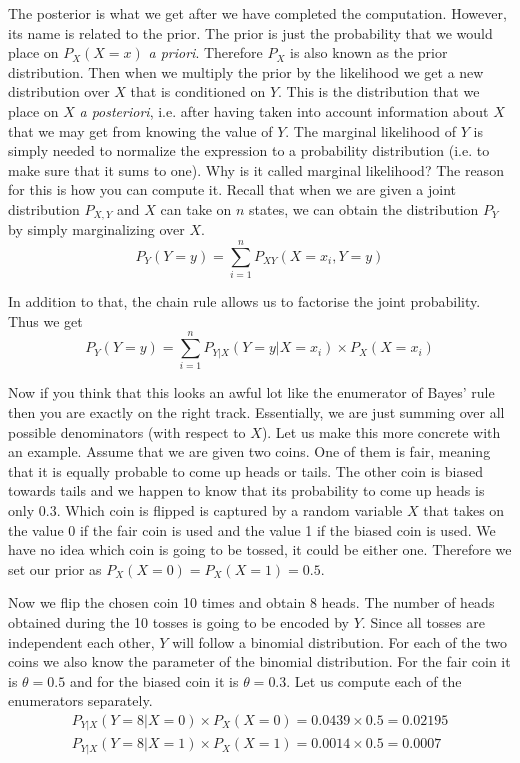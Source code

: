 \documentclass[a4paper,11pt,leqno]{report}
\begin{document}
The posterior is what we get after we have completed the computation. However, its name is related to the prior.
The prior is just the probability that we would place on $ P_{X}(X=x) $ \textit{a priori}. Therefore $ P_{X} $
is also known as the prior distribution. Then when we multiply the prior by the likelihood we get a new distribution
over $ X $ that is conditioned on $ Y $. This is the distribution that we place on $ X $ \textit{a posteriori}, i.e.
after having taken into account information about $ X $ that we may get from knowing the value of $ Y $. The marginal
likelihood of $ Y $ is simply needed to normalize the expression to a probability distribution (i.e. to make sure that
it sums to one). Why is it called marginal likelihood? The reason for this is how you can compute it. Recall that when
we are given a joint distribution $ P_{X,Y} $ and $ X $ can take on $ n $ states, we can obtain the distribution
$ P_{Y} $ by simply marginalizing over $ X $.
\begin{equation}
P_{Y}(Y=y) = \underset{i=1}{\overset{n}{\sum}}P_{XY}(X=x_{i}, Y=y)
\end{equation}

In addition to that, the chain rule allows us to factorise the joint probability. Thus we get
\begin{equation}
P_{Y}(Y=y) = \underset{i=1}{\overset{n}{\sum}}P_{Y|X}(Y=y|X=x_{i}) \times P_{X}(X=x_{i})
\end{equation}

Now if you think that this looks an awful lot like the enumerator of Bayes' rule then you are exactly on the right track.
Essentially, we are just summing over all possible denominators (with respect to $ X $). Let us make this more
concrete with an example. Assume that we are given two coins. One of them is fair, meaning that it is equally probable
to come up heads or tails. The other coin is biased towards tails and we happen to know that its probability to come up
heads is only $ 0.3 $. Which coin is flipped is captured by a random variable $ X $ that takes on the value 0 if the
fair coin is used and the value 1 if the biased coin is used. We have no idea which coin is going to be tossed, it could
be either one. Therefore we set our prior as $ P_{X}(X=0) = P_{X}(X=1) = 0.5 $.

Now we flip the chosen coin 10 times and obtain 8 heads. The number of heads obtained during the 10 tosses is going
to be encoded by $ Y $. Since all tosses are independent each other, $ Y $ will
follow a binomial distribution. For each of the two coins we also know the parameter of the binomial distribution.
For the fair coin it is $ \theta = 0.5 $ and for the biased coin it is $ \theta = 0.3 $. Let us compute each of the
enumerators separately.
\begin{align}
P_{Y|X}(Y=8|X=0) \times P_{X}(X=0) = 0.0439 \times 0.5 = 0.02195 \label{bayes1} \\ 
P_{Y|X}(Y=8|X=1) \times P_{X}(X=1) = 0.0014 \times 0.5 = 0.0007 \label{bayes2}
\end{align}
\end{document}
